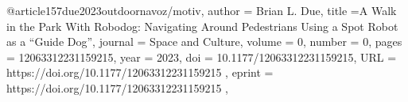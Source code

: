 @article{157due2023outdoornavoz/motiv,
author = {Brian L. Due},
title ={A Walk in the Park With Robodog: Navigating Around Pedestrians Using a Spot Robot as a “Guide Dog”},
journal = {Space and Culture},
volume = {0},
number = {0},
pages = {12063312231159215},
year = {2023},
doi = {10.1177/12063312231159215},
URL = { https://doi.org/10.1177/12063312231159215 },
eprint = { https://doi.org/10.1177/12063312231159215 },
}